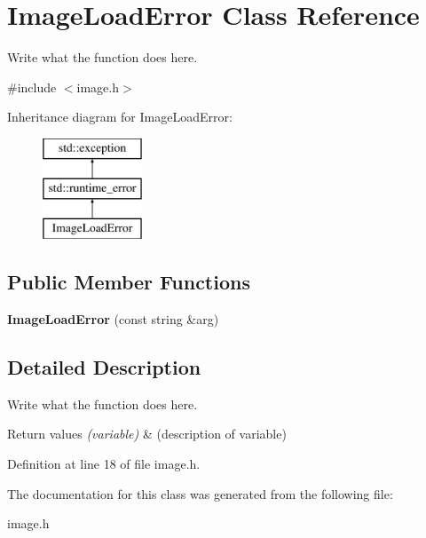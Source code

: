 \hypertarget{classImageLoadError}{\section{Image\+Load\+Error Class Reference}
\label{classImageLoadError}
}


Write what the function does here.  




{\ttfamily \#include $<$image.\+h$>$}

Inheritance diagram for Image\+Load\+Error\+:\begin{figure}[H]
\begin{center}
\leavevmode
\includegraphics[height=3.000000cm]{classImageLoadError}
\end{center}
\end{figure}
\subsection*{Public Member Functions}
\begin{DoxyCompactItemize}
\item 
\hypertarget{classImageLoadError_a578b21971e45108555b175a9638b388d}{{\bfseries Image\+Load\+Error} (const string \&arg)}\label{classImageLoadError_a578b21971e45108555b175a9638b388d}

\end{DoxyCompactItemize}


\subsection{Detailed Description}
Write what the function does here. 


\begin{DoxyRetVals}{Return values}
{\em (variable)} & (description of variable) \\
\hline
\end{DoxyRetVals}


Definition at line 18 of file image.\+h.



The documentation for this class was generated from the following file\+:\begin{DoxyCompactItemize}
\item 
image.\+h\end{DoxyCompactItemize}
